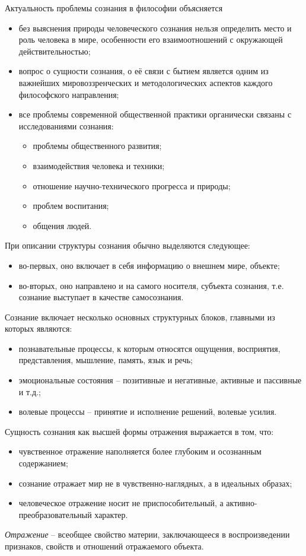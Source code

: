 
Актуальность проблемы сознания в философии объясняется
\begin{itemize}
    \item без выяснения природы человеческого сознания нельзя определить место и роль человека в мире, 
        особенности его взаимоотношений с окружающей действительностью;
    \item вопрос о сущности сознания, о её связи с бытием является одним из важнейших мировоззренческих и 
        методологических аспектов каждого философского направления;
    \item все проблемы современной общественной практики органически связаны с исследованиями сознания:
    \begin{itemize}
        \item проблемы общественного развития;
        \item взаимодействия человека и техники;
        \item отношение научно-технического прогресса и природы;
        \item проблем воспитания;
        \item общения людей.
    \end{itemize}
\end{itemize}

При описании структуры сознания обычно выделяются следующее:
\begin{itemize}
    \item во-первых, оно включает в себя информацию о внешнем мире, объекте;
    \item во-вторых, оно направлено и на самого носителя, субъекта сознания, т.е. сознание выступает в 
        качестве самосознания.
\end{itemize}

Сознание включает несколько основных структурных блоков, главными из которых являются:
\begin{itemize}
    \item познавательные процессы, к которым относятся ощущения, восприятия, представления, мышление, 
        память, язык и речь;
    \item эмоциональные состояния -- позитивные и негативные, активные и пассивные и т.д.;
    \item волевые процессы -- принятие и исполнение решений, волевые усилия.
\end{itemize}

Сущность сознания как высшей формы отражения выражается в том, что:
\begin{itemize}
    \item чувственное отражение наполняется более глубоким и осознанным содержанием;
    \item сознание отражает мир не в чувственно-наглядных, а в идеальных образах;
    \item человеческое отражение носит не приспособительный, а активно-преобразовательный характер.
\end{itemize}

\emph{Отражение} -- всеобщее свойство материи, заключающееся в воспроизведении признаков, свойств и 
отношений отражаемого объекта. 